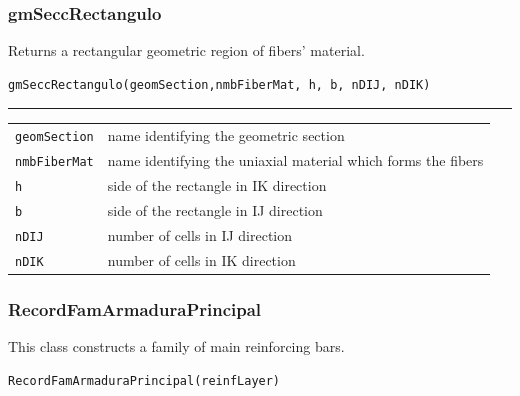 \subsubsection{gmSeccRectangulo}
Returns a rectangular geometric region of fibers' material.
\noindent 
\begin{verbatim}
gmSeccRectangulo(geomSection,nmbFiberMat, h, b, nDIJ, nDIK)
\end{verbatim}
\vspace{-10pt}
{\color{grayLines} \rule{\linewidth}{0.25pt}}
\begin{center}
\begin{tabular}{lp{10cm}}
{\tt geomSection} & name identifying the geometric section \\
{\tt nmbFiberMat} & name identifying the uniaxial material which forms the fibers\\
{\tt h} & side of the rectangle in IK direction \\
{\tt b} & side of the rectangle in IJ direction \\
{\tt nDIJ} & number of cells in IJ direction \\
{\tt nDIK} & number of cells in IK direction \\
\end{tabular}
\end{center}


\subsubsection{RecordFamArmaduraPrincipal}
\noindent This class constructs a family of main reinforcing bars.
\begin{verbatim}
RecordFamArmaduraPrincipal(reinfLayer)
\end{verbatim}

